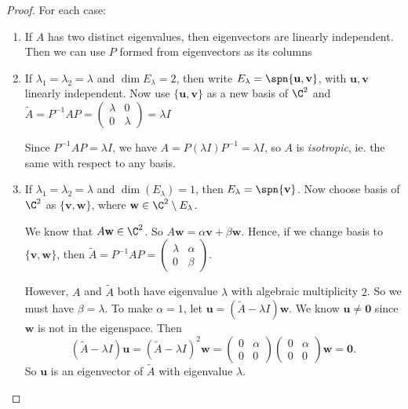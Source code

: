\documentclass[a4paper]{article}
\begin{document}
      \begin{proof}
        For each case:
        \begin{enumerate}
          \item If $A$ has two distinct eigenvalues, then eigenvectors are linearly independent. Then we can use $P$ formed from eigenvectors as its columns
          \item If $\lambda_1=\lambda_2 = \lambda$ and $\dim E_\lambda = 2$, then write $E_\lambda = \spn\{\mathbf{u}, \mathbf{v}\}$, with $\mathbf{u}, \mathbf{v}$ linearly independent. Now use $\{\mathbf{u}, \mathbf{v}\}$  as a new basis of $\C^2$ and $\tilde{A} = P^{-1}AP = 
            \begin{pmatrix}
              \lambda & 0\\
              0 & \lambda
            \end{pmatrix} = \lambda I$

            \note Since $P^{-1}AP = \lambda I$, we have $A = P(\lambda I)P^{-1} = \lambda I$, so $A$ is \emph{isotropic}, ie. the same with respect to any basis.
          \item If $\lambda_1 = \lambda_2 = \lambda$ and $\dim (E_\lambda) = 1$, then $E_\lambda = \spn\{\mathbf{v}\}$. Now choose basis of $\C^2$ as $\{\mathbf{v}, \mathbf{w}\}$, where $\mathbf{w}\in \C^2\setminus E_\lambda$.

            We know that $A\mathbf{w}\in \C^2$. So $A\mathbf{w} = \alpha \mathbf{v} + \beta \mathbf{w}$. Hence, if we change basis to $\{\mathbf{v}, \mathbf{w}\}$, then $\tilde{A} = P^{-1}AP = 
            \begin{pmatrix}
              \lambda & \alpha\\
              0 & \beta
            \end{pmatrix}$.

            However, $A$ and $\tilde{A}$ both have eigenvalue $\lambda$ with algebraic multiplicity $2$. So we must have $\beta = \lambda$. To make $\alpha = 1$, let $\mathbf{u} = (\tilde{A} - \lambda I)\mathbf{w}$. We know $\mathbf{u}\not= \mathbf{0}$ since $\mathbf{w}$ is not in the eigenspace. Then 
            \[
              (\tilde{A} - \lambda I)\mathbf{u} = (\tilde{A} - \lambda I)^2 \mathbf{w} = 
              \begin{pmatrix}
                0 & \alpha\\
                0 & 0
              \end{pmatrix}
              \begin{pmatrix}
                0 & \alpha\\
                0 & 0
              \end{pmatrix}\mathbf{w} = \mathbf{0}.
            \]
            So $\mathbf{u}$ is an eigenvector of $\tilde{A}$ with eigenvalue $\lambda$.


\end{enumerate}
\end{proof}
\end{document}
